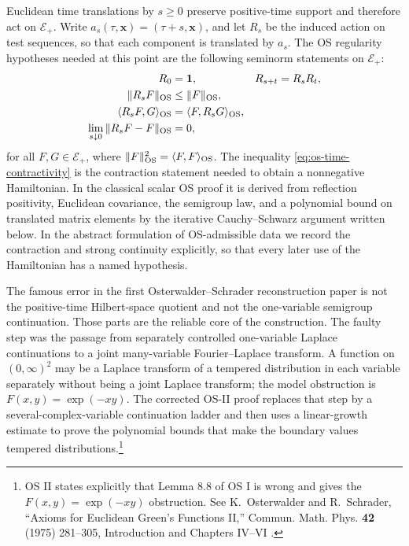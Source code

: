 Euclidean time translations by \(s\ge0\) preserve positive-time support and
therefore act on \(\mathcal E_+\).  Write \(a_s(\tau,\mathbf x)=(\tau+s,\mathbf
x)\), and let \(R_s\) be the induced action on test sequences, so that each
component is translated by \(a_s\).  The OS regularity hypotheses needed at
this point are the following seminorm statements on \(\mathcal E_+\):
\begin{align}
  R_0&=\mathbf 1,
  &
  R_{s+t}&=R_sR_t,
  \label{eq:os-time-semigroup-law}\\
  \|R_sF\|_{\rm OS}&\le \|F\|_{\rm OS},
  \label{eq:os-time-contractivity}\\
  \langle R_sF,G\rangle_{\rm OS}
  &=
  \langle F,R_sG\rangle_{\rm OS},
  \label{eq:os-time-symmetry}\\
  \lim_{s\downarrow0}\|R_sF-F\|_{\rm OS}&=0,
  \label{eq:os-time-strong-continuity}
\end{align}
for all \(F,G\in\mathcal E_+\), where
\(\|F\|_{\rm OS}^2=\langle F,F\rangle_{\rm OS}\).  The inequality
\eqref{eq:os-time-contractivity} is the contraction statement needed to obtain
a nonnegative Hamiltonian.  In the classical scalar OS proof it is derived from
reflection positivity, Euclidean covariance, the semigroup law, and a
polynomial bound on translated matrix elements by the iterative
Cauchy--Schwarz argument written below.  In the abstract formulation of
OS-admissible data we record the contraction and strong continuity explicitly,
so that every later use of the Hamiltonian has a named hypothesis.

\begin{remark}
\label{rem:os-i-lemma-eight-eight-gap}
The famous error in the first Osterwalder--Schrader reconstruction paper is
not the positive-time Hilbert-space quotient and not the one-variable
semigroup continuation.  Those parts are the reliable core of the construction.
The faulty step was the passage from separately controlled one-variable
Laplace continuations to a joint many-variable Fourier--Laplace transform.  A
function on \((0,\infty)^2\) may be a Laplace transform of a tempered
distribution in each variable separately without being a joint Laplace
transform; the model obstruction is \(F(x,y)=\exp(-xy)\).  The corrected OS-II
proof replaces that step by a several-complex-variable continuation ladder and
then uses a linear-growth estimate to prove the polynomial bounds that make the
boundary values tempered distributions.\footnote{OS II states explicitly that
Lemma 8.8 of OS I is wrong and gives the \(F(x,y)=\exp(-xy)\) obstruction.  See
K.~Osterwalder and R.~Schrader, ``Axioms for Euclidean Green's Functions II,''
Commun. Math. Phys. \textbf{42} (1975) 281--305, Introduction and Chapters
IV--VI \cite{OS1975}.}
\end{remark}

